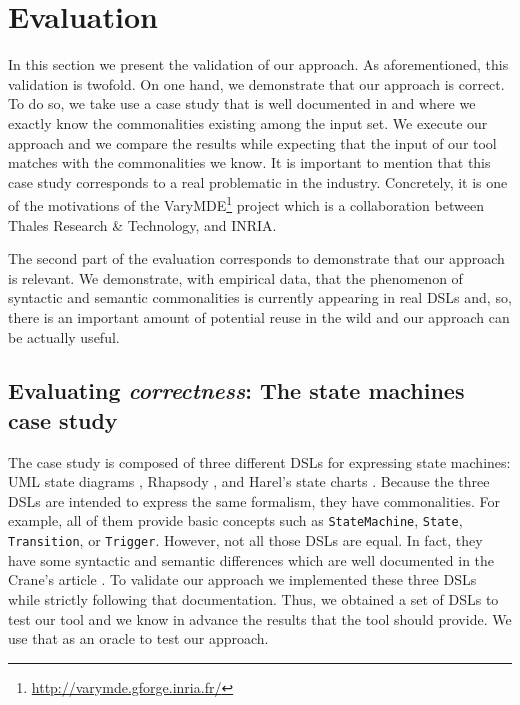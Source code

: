 \section{Evaluation}
\label{sec:validation}

In this section we present the validation of our approach. As aforementioned, this validation is twofold. On one hand, we demonstrate that our approach is correct. To do so, we take use a case study that is well documented in \cite{Crane:2007} and where we exactly know the commonalities existing among the input set. We execute our approach and we compare the results while expecting that the input of our tool matches with the commonalities we know. It is important to mention that this case study corresponds to a real problematic in the industry. Concretely, it is one of the motivations of the VaryMDE\footnote{\url{http://varymde.gforge.inria.fr/}} project which is a collaboration between Thales Research \& Technology, and INRIA.  

The second part of the evaluation corresponds to demonstrate that our approach is relevant. We demonstrate, with empirical data, that the phenomenon of syntactic and semantic commonalities is currently appearing in real DSLs and, so, there is an important amount of potential reuse in the wild and our approach can be actually useful. 

\subsection{Evaluating \textit{correctness}: The state machines case study}

The case study is composed of three different DSLs for expressing state machines:  UML state diagrams \cite{UML:2011}, Rhapsody \cite{Harel:2004}, and Harel's state charts \cite{Harel:1996}. Because the three DSLs are intended to express the same formalism, they have commonalities. For example, all of them provide basic concepts such as \texttt{StateMachine}, \texttt{State}, \texttt{Transition}, or \texttt{Trigger}. However, not all those DSLs are equal. In fact, they have some syntactic and semantic differences which are well documented in the Crane's article \cite{Crane:2007}. To validate our approach we implemented these three DSLs while strictly following that documentation. Thus, we obtained a set of DSLs to test our tool and we know in advance the results that the tool should provide. We use that as an oracle to test our approach. 

